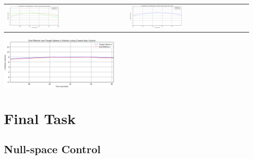 \documentclass[11pt]{article}
\begin{document}
\begin{center}
    \begin{tabular}{ll}
        \includegraphics[width=0.45\textwidth]{images/3.2x.png}
        &
        \includegraphics[width=0.45\textwidth]{images/3.2y.png}
    \end{tabular}
    \includegraphics[width=0.45\textwidth]{images/3.2z.png}
\end{center}

\section{Final Task}
\setcounter{subsection}{1}
\subsection{Null-space Control}
\end{document}
